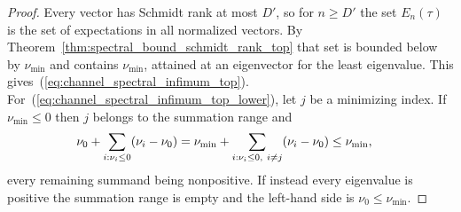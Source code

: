 \begin{proof}
    \leanok
    Every vector has Schmidt rank at most $D'$, so for $n\ge D'$ the set
    $E_n(\tau)$ is the set of expectations in all normalized vectors. By
    Theorem~\ref{thm:spectral_bound_schmidt_rank_top} that set is bounded below
    by $\nu_{\min}$ and contains $\nu_{\min}$, attained at an eigenvector for
    the least eigenvalue. This gives~(\ref{eq:channel_spectral_infimum_top}).
    For~(\ref{eq:channel_spectral_infimum_top_lower}), let $j$ be a minimizing
    index. If $\nu_{\min}\le0$ then $j$ belongs to the summation range and
    \begin{align}
        \nu_0+\sum_{i:\nu_i\le0}(\nu_i-\nu_0)
        &= \nu_{\min}+\sum_{i:\nu_i\le0,\ i\ne j}(\nu_i-\nu_0)
        \le \nu_{\min},
        \notag
    \end{align}
    every remaining summand being nonpositive. If instead every eigenvalue is
    positive the summation range is empty and the left-hand side is
    $\nu_0\le\nu_{\min}$.
\end{proof}
